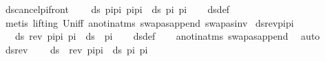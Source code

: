 \begin{isabellebody}
\isanewline
{}\isamarkupfalse%
\ ds{\isacharunderscore}{\kern0pt}cancel{\isacharunderscore}{\kern0pt}pi{\isacharunderscore}{\kern0pt}front{\isacharcolon}{\kern0pt}\ \isanewline
\ \ \ {\isachardoublequoteopen}ds\ {\isacharparenleft}{\kern0pt}pi{\isacharat}{\kern0pt}pi{}{\isacharparenright}{\kern0pt}\ {\isacharparenleft}{\kern0pt}pi{\isacharat}{\kern0pt}pi{}{\isacharparenright}{\kern0pt}\ {\isacharequal}{\kern0pt}\ ds\ pi{}\ pi{}{\isachardoublequoteclose}\isanewline
%
\isadelimproof
\ \ %
\endisadelimproof
%
\isatagproof
{}\isamarkupfalse%
\ ds{\isacharunderscore}{\kern0pt}def\isanewline
\ \ \isamarkupfalse%
\ {\isacharparenleft}{\kern0pt}metis\ {\isacharparenleft}{\kern0pt}lifting{\isacharparenright}{\kern0pt}\ Un{\isacharunderscore}{\kern0pt}iff\ a{\isacharunderscore}{\kern0pt}not{\isacharunderscore}{\kern0pt}in{\isacharunderscore}{\kern0pt}atms\ swapas{\isacharunderscore}{\kern0pt}append\ swapas{\isacharunderscore}{\kern0pt}inv{\isacharparenright}{\kern0pt}%
\endisatagproof
{\isafoldproof}%
%
\isadelimproof
\isanewline
%
\endisadelimproof
\isanewline
{}\isamarkupfalse%
\ ds{\isacharunderscore}{\kern0pt}rev{\isacharunderscore}{\kern0pt}pi{\isacharunderscore}{\kern0pt}pi{\isacharcolon}{\kern0pt}\ \isanewline
\ \ \ {\isachardoublequoteopen}ds\ {\isacharparenleft}{\kern0pt}{\isacharparenleft}{\kern0pt}rev\ pi{}{\isacharparenright}{\kern0pt}{\isacharat}{\kern0pt}pi{}{\isacharparenright}{\kern0pt}\ pi{}\ {\isacharequal}{\kern0pt}\ ds\ {\isacharbrackleft}{\kern0pt}{\isacharbrackright}{\kern0pt}\ pi{}{\isachardoublequoteclose}\isanewline
%
\isadelimproof
\ \ %
\endisadelimproof
%
\isatagproof
{}\isamarkupfalse%
\ ds{\isacharunderscore}{\kern0pt}def\isanewline
\ \ \isamarkupfalse%
\ a{\isacharunderscore}{\kern0pt}not{\isacharunderscore}{\kern0pt}in{\isacharunderscore}{\kern0pt}atms\ swapas{\isacharunderscore}{\kern0pt}append\ \isamarkupfalse%
\ auto%
\endisatagproof
{\isafoldproof}%
%
\isadelimproof
\ \isanewline
%
\endisadelimproof
\isanewline
{}\isamarkupfalse%
\ ds{\isacharunderscore}{\kern0pt}rev{\isacharcolon}{\kern0pt}\ \isanewline
\ \ \ {\isachardoublequoteopen}ds\ {\isacharbrackleft}{\kern0pt}{\isacharbrackright}{\kern0pt}\ {\isacharparenleft}{\kern0pt}{\isacharparenleft}{\kern0pt}rev\ pi{}{\isacharparenright}{\kern0pt}{\isacharat}{\kern0pt}pi{}{\isacharparenright}{\kern0pt}\ {\isacharequal}{\kern0pt}\ ds\ pi{}\ pi{}{\isachardoublequoteclose}\isanewline

\end{isabellebody}

